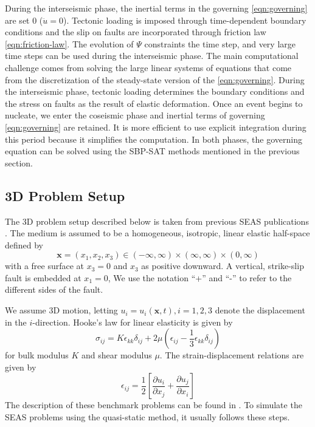 During the interseismic phase, the inertial terms in the governing \autoref{eqn:governing} are set 0 ($\ddot{u} = 0$).
Tectonic loading is imposed through time-dependent boundary conditions and the slip on faults are incorporated through friction law \autoref{eqn:friction-law}.
The evolution of $\Psi$ constraints the time step, and very large time steps can be used during the interseismic phase.
The main computational challenge comes from solving the large linear systems of equations that come from the discretization of the steady-state version of the \autoref{eqn:governing}.
During the interseismic phase, tectonic loading determines the boundary conditions and the stress on faults as the result of elastic deformation.
Once an event begins to nucleate, we enter the coseismic phase and inertial terms of governing \autoref{eqn:governing} are retained.
It is more efficient to use explicit integration during this period because it simplifies the computation. In both phases, the governing equation can be solved using the SBP-SAT methods mentioned in the previous section.

\subsection{3D Problem Setup}
The 3D problem setup described below is taken from previous SEAS publications \cite{10.1785/0220190248}.
The medium is assumed to be a homogeneous, isotropic, linear elastic half-space defined by
\begin{equation} \label{eqn:domain}
    \textbf{x} = (x_1, x_2, x_3) \in (-\infty, \infty) \times (\infty, \infty) \times (0, \infty)
\end{equation}
with a free surface at $x_3 = 0$ and $x_3$ as positive downward. A vertical, strike-slip fault is embedded at $x_1 = 0$, We use the notation ``+'' and ``-'' to refer to the different sides of the fault. 

We assume 3D motion, letting $u_i = u_i(\textbf{x}, t), i = 1, 2, 3$ denote the displacement in the $i$-direction.
Hooke’s law for linear elasticity is given by
\begin{equation}
    \sigma_{ij} = K\epsilon_{kk}\delta_{ij} + 2\mu (\epsilon_{ij} - \frac{1}{3} \epsilon_{kk}\delta_{ij})
\end{equation}
for bulk modulus $K$ and shear modulus $\mu$. The strain-displacement relations are given by 
\begin{equation}
    \epsilon_{ij} = \frac{1}{2} \left[\frac{\partial u_i}{\partial x_j} + \frac{\partial u_j}{\partial x_i}\right]
\end{equation}
The description of these benchmark problems can be found in \cite{erickson2018seas,jiang2020seas}.
To simulate the SEAS problems using the quasi-static method, it usually follows these steps.

